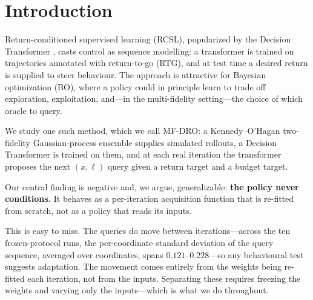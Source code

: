 \documentclass[11pt]{article}
\begin{document}
\section{Introduction}

Return-conditioned supervised learning (RCSL), popularized by the Decision
Transformer \citep{chen2021dt}, casts control as sequence modelling: a
transformer is trained on trajectories annotated with return-to-go (RTG), and at
test time a desired return is supplied to steer behaviour. The approach is
attractive for Bayesian optimization (BO), where a policy could in principle
learn to trade off exploration, exploitation, and---in the multi-fidelity
setting---the choice of which oracle to query.

We study one such method, which we call MF-DRO: a Kennedy--O'Hagan two-fidelity
Gaussian-process ensemble \citep{Kennedy_2000} supplies simulated rollouts, a
Decision Transformer is trained on them, and at each real iteration the
transformer proposes the next $(x, \ell)$ query given a return target and a
budget target.

Our central finding is negative and, we argue, generalizable: \textbf{the policy
never conditions.} It behaves as a per-iteration acquisition function that is
re-fitted from scratch, not as a policy that reads its inputs.

This is easy to miss. The queries do move between iterations---across the ten
frozen-protocol runs, the per-coordinate standard deviation of the query
sequence, averaged over coordinates, spans $0.121$--$0.228$---so any behavioural
test suggests
adaptation. The movement comes entirely from the weights being re-fitted each
iteration, not from the inputs. Separating these requires freezing the weights
and varying only the inputs---which is what we do throughout.
\end{document}
